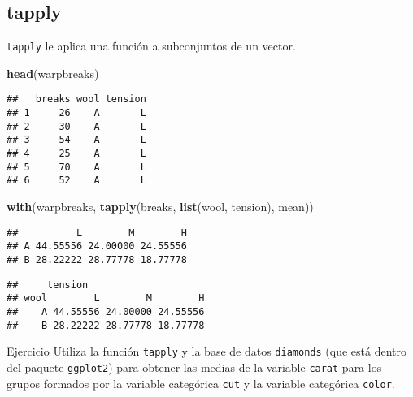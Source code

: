 \documentclass[]{article}
\newenvironment{Shaded}{\begin{snugshade}}{\end{snugshade}}
\newcommand{\KeywordTok}[1]{\textcolor[rgb]{0.13,0.29,0.53}{\textbf{{#1}}}}
\newcommand{\DataTypeTok}[1]{\textcolor[rgb]{0.13,0.29,0.53}{{#1}}}
\newcommand{\NormalTok}[1]{{#1}}
\begin{document}
\subsection{tapply}\label{tapply}

\texttt{tapply} le aplica una función a subconjuntos de un vector.

\begin{Shaded}
\begin{Highlighting}[]
\KeywordTok{head}\NormalTok{(warpbreaks)}
\end{Highlighting}
\end{Shaded}

\begin{verbatim}
##   breaks wool tension
## 1     26    A       L
## 2     30    A       L
## 3     54    A       L
## 4     25    A       L
## 5     70    A       L
## 6     52    A       L
\end{verbatim}

\begin{Shaded}
\begin{Highlighting}[]
\KeywordTok{with}\NormalTok{(warpbreaks, }\KeywordTok{tapply}\NormalTok{(breaks, }\KeywordTok{list}\NormalTok{(wool, tension), mean))}
\end{Highlighting}
\end{Shaded}

\begin{verbatim}
##          L        M        H
## A 44.55556 24.00000 24.55556
## B 28.22222 28.77778 18.77778
\end{verbatim}

\begin{Shaded}
\end{Shaded}

\begin{verbatim}
##     tension
## wool        L        M        H
##    A 44.55556 24.00000 24.55556
##    B 28.22222 28.77778 18.77778
\end{verbatim}

\renewcommand\bcStyleTitre[1]{\large\textcolor{bbblack}{#1}}

\begin{bclogo}[
  couleur=llred,
  arrondi=0,
  logo=\bcstop,
  barre=none,
  noborder=true]{Ejercicio}
Utiliza la función \texttt{tapply} y la base de datos \texttt{diamonds} (que está
dentro del paquete \texttt{ggplot2}) para obtener las medias de la 
variable \texttt{carat} para los grupos
formados por la variable categórica \texttt{cut} y la variable categórica
\texttt{color}.
\end{bclogo}
\end{document}
